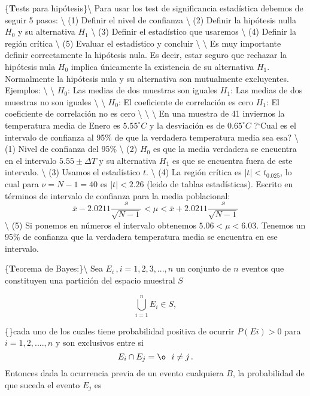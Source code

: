 \documentclass[
]{agujournal2019}
\begin{document}
\{\noindent \textbf Tests para hipótesis\}\textbackslash{} Para usar los
test de significancia estadística debemos de seguir 5 pasos:
\textbackslash{} (1) Definir el nivel de confianza \textbackslash{} (2)
Definir la hipótesis nulla \(H_0\) y su alternativa \(H_1\)
\textbackslash{} (3) Definir el estadístico que usaremos
\textbackslash{} (4) Definir la región crítica \textbackslash{} (5)
Evaluar el estadístico y concluir \textbackslash{} \textbackslash{} Es
muy importante definir correctamente la hipótesis nula. Es decir, estar
seguro que rechazar la hipótesis nula \(H_0\) implica únicamente la
existencia de su alternativa \(H_1\). Normalmente la hipótesis nula y su
alternativa son mutualmente excluyentes. Ejemplos: \textbackslash{}
\textbackslash{} \(H_0\): Las medias de dos muestras son iguales
\(H_1\): Las medias de dos muestras no son iguales \textbackslash{}
\textbackslash{} \(H_0\): El coeficiente de correlación es cero \(H_1\):
El coeficiente de correlación no es cero \textbackslash{}
\textbackslash{} \vspace{0.5cm}
\textbackslash{} En una muestra de 41
inviernos la temperatura media de Enero es \(5.55^\circ{C}\) y la
desviación es de \(0.65^\circ{C}\) ?{}`Cual es el intervalo de confianza
al 95\% de que la verdadera temperatura media sea esa? \textbackslash{}
(1) Nivel de confianza del 95\% \textbackslash{} (2) \(H_0\) es que la
media verdadera se encuentra en el intervalo \(5.55\pm \Delta{T}\) y su
alternativa \(H_1\) es que se encuentra fuera de este intervalo.
\textbackslash{} (3) Usamos el estadístico \(t\). \textbackslash{} (4)
La región crítica es \(|t|<t_{0.025}\), lo cual para \(\nu=N-1=40\) es
\(|t|<2.26\) (leido de tablas estadísticas). Escrito en términos de
intervalo de confianza para la media poblacional:
\[\bar{x}-2.0211\frac{s}{\sqrt{N-1}}<\mu<\bar{x}+2.0211\frac{s}{\sqrt{N-1}}  \]
\textbackslash{} (5) Si ponemos en números el intervalo obtenemos
\(5.06<\mu<6.03\). Tenemos un 95\% de confianza que la verdadera
temperatura media se encuentra en ese intervalo.

\vspace{0.5cm}

\{\noindent \textbf Teorema de Bayes:\}\textbackslash{} Sea
\(E_i\,,i=1,2,3,...,n\) un conjunto de \(n\) eventos que constituyen una
partición del espacio muestral \(S\)

\[\bigcup^n_{i=1}E_i\in S,\]

\{\noindent\}cada uno de los cuales tiene probabilidad positiva de
ocurrir \(P(Ei)>0\) para \(i=1,2,....,n\) y son exclusivos entre si
\[E_i\cap E_j=\o \,\,\,\,i\ne j\,.\] Entonces dada la ocurrencia previa
de un evento cualquiera \(B\), la probabilidad de que suceda el evento
\(E_j\) es
\end{document}
